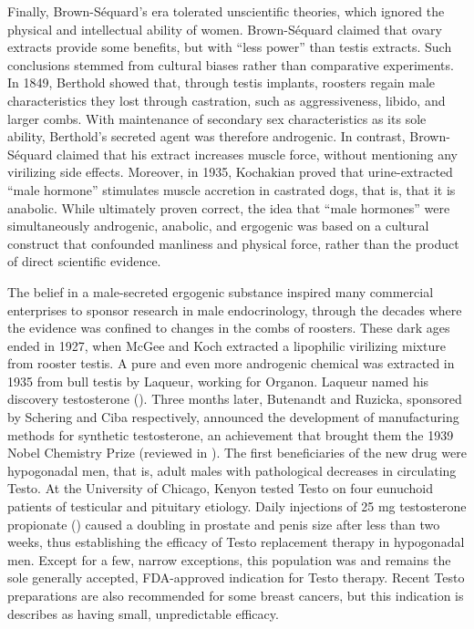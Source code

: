 \documentclass[12pt,english]{report}\usepackage[]{graphicx}\usepackage[]{color}
\begin{document}
Finally, Brown-Séquard's era tolerated unscientific theories, which
ignored the physical and intellectual ability of women. Brown-Séquard
claimed that ovary extracts provide some benefits, but with ``less
power'' than testis extracts\citep{brown-sequard1893new}. Such conclusions
stemmed from cultural biases rather than comparative experiments.
In 1849, Berthold showed that, through testis implants, roosters regain
male characteristics they lost through castration, such as aggressiveness,
libido, and larger combs\citep{berthold1849transplantation}. With
maintenance of secondary sex characteristics as its sole ability,
Berthold's secreted agent was therefore androgenic. In contrast, Brown-Séquard
claimed that his extract increases muscle force, without mentioning
any virilizing side effects. Moreover, in 1935, Kochakian proved that
urine-extracted ``male hormone'' stimulates muscle accretion in
castrated dogs, that is, that it is anabolic\citep{kochakian1935effect}.
While ultimately proven correct, the idea that ``male hormones''
were simultaneously androgenic, anabolic, and ergogenic was based
on a cultural construct that confounded manliness and physical force,
rather than the product of direct scientific evidence.

The belief in a male-secreted ergogenic substance inspired many commercial
enterprises to sponsor research in male endocrinology, through the
decades where the evidence was confined to changes in the combs of
roosters. These dark ages ended in 1927, when McGee and Koch extracted
a lipophilic virilizing mixture from rooster testis\citep{gallagher1929testicular,mcgee1928development}.
A pure and even more androgenic chemical was extracted in 1935 from
bull testis by Laqueur, working for Organon\citep{david1935uber}.
Laqueur named his discovery testosterone ().
Three months later, Butenandt and Ruzicka, sponsored by Schering and
Ciba respectively, announced the development of manufacturing methods
for synthetic testosterone, an achievement that brought them the 1939
Nobel Chemistry Prize (reviewed in \citep{hoberman1995history}).
The first beneficiaries of the new drug were hypogonadal men, that
is, adult males with pathological decreases in circulating Testo.
At the University of Chicago, Kenyon tested Testo on four eunuchoid
patients of testicular and pituitary etiology. Daily injections of
25 mg testosterone propionate ()
caused a doubling in prostate and penis size\citep{kenyon1938effect}
after less than two weeks, thus establishing the efficacy of Testo
replacement therapy in hypogonadal men. Except for a few, narrow exceptions,
this population was and remains the sole generally accepted, FDA-approved
indication for Testo therapy\citep{auxiliumpharmaceuticalsinc.2014testim,endopharmaceuticalssolutionsinc.2014delatestryl,unimed2004androgel}.
Recent Testo preparations are also recommended for some breast cancers,
but this indication is describes as having small, unpredictable efficacy.
\end{document}
